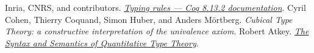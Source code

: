 \documentclass[book]{jlreq}
\begin{document}
\backmatter

\begin{thebibliography}{99}
    Inria, CNRS, and contributors.
    \href{https://coq.github.io/doc/v8.13/refman/language/cic.html}{\textit{Typing rules --- Coq 8.13.2 documentation}}.
    Cyril Cohen, Thierry Coquand, Simon Huber, and Anders Mörtberg.
    \textit{Cubical Type Theory: a constructive interpretation of the univalence axiom}.
    Robert Atkey.
    \href{https://bentnib.org/quantitative-type-theory.html}{\textit{The Syntax and Semantics of Quantitative Type Theory}}.
\end{thebibliography}

\printindex
\end{document}
